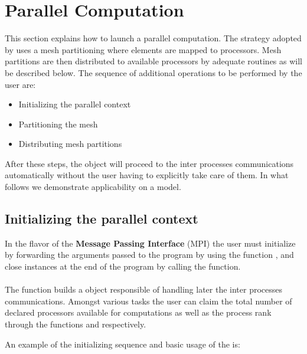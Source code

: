 \chapter{Parallel Computation}

This section explains how to launch a parallel computation.
The strategy adopted by \akantu uses a mesh partitioning 
where elements are mapped to processors. Mesh partitions are
then distributed to available processors by adequate routines
as will be described below.  
The sequence of additional operations to be performed by the user are:

\begin{itemize}
\item Initializing the parallel context
\item Partitioning the mesh
\item Distributing mesh partitions
\end{itemize}

After these steps, the 
object will proceed to the inter processes communications automatically
without the user having to explicitly take care of them.
In what follows we demonstrate applicability on a 
 model.

\section{Initializing the parallel context}

In the flavor of the \textbf{Message Passing Interface} (MPI) 
the user must initialize \akantu by forwarding the arguments passed to the program
by using the function , and close \akantu instances 
at the end of the program by calling the  function.\\

\\

The  function builds a  object 
responsible of handling later the inter processes communications.
Amongst various tasks the user can claim the total number of declared 
processors available for computations as well as the process rank through 
the functions  and  respectively.

An example of the initializing sequence and basic usage of the 
 is:


